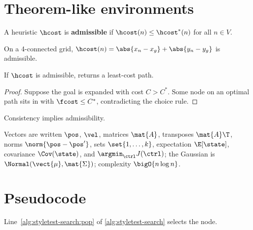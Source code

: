 \section{Theorem-like environments}
\begin{definition}\label{def:styletest-adm}
A heuristic $\hcost$ is \textbf{admissible} if $\hcost(n) \le \hcost^*(n)$ for all $n \in V$.
\end{definition}
\begin{example}\label{ex:styletest-manhattan}
On a 4-connected grid, $\hcost(n) = \abs{x_n - x_g} + \abs{y_n - y_g}$ is admissible.
\end{example}
\begin{theorem}\label{thm:styletest-opt}
If $\hcost$ is admissible, \astar returns a least-cost path.
\end{theorem}
\begin{proof}
Suppose the goal is expanded with cost $C > C^*$. Some node on an optimal path sits in \Open with $\fcost \le C^*$, contradicting the choice rule. \qedhere
\end{proof}
\begin{lemma}\label{lem:styletest}
Consistency implies admissibility.
\end{lemma}
\begin{remark}
Vectors are written $\pos$, $\vel$, matrices $\mat{A}$, transposes $\mat{A}\T$, norms $\norm{\pos - \pos'}$, sets $\set{1,\dots,k}$, expectation $\E[\state]$, covariance $\Cov(\state)$, and $\argmin_{\ctrl} J(\ctrl)$; the Gaussian is $\Normal(\vect{\mu}, \mat{\Sigma})$; complexity $\bigO{n \log n}$.
\end{remark}
\section{Pseudocode}
\begin{algorithm}[htb]
\caption{Best-first search skeleton}
\label{alg:styletest-search}
\end{algorithm}
Line~\ref{alg:styletest-search:pop} of \cref{alg:styletest-search} selects the node.
